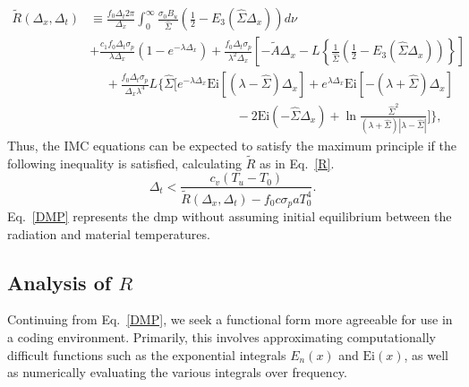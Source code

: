 \begin{align}\label{R}
\tilde R(\Delta_x,\Delta_t)&\equiv\frac{f_0\Delta_t2\pi}{\Delta_x}
  \int_0^\infty\frac{\sigma_0B_u}{\hat\Sigma}\left(\frac{1}{2}-
    E_3(\hat\Sigma\Delta_x)\right)d\nu \nonumber\\
  &+\frac{c_1f_0\Delta_t\sigma_p}{\lambda\Delta_x}(1-e^{-\lambda\Delta_x}) +
  \frac{f_0\Delta_t\sigma_p}{\lambda^2\Delta_x}\left[-\tilde A\Delta_x
    -L\left\{\frac{1}{\hat\Sigma}\left(\frac{1}{2}
    -E_3(\hat\Sigma\Delta_x)\right)\right\}\right] \\
  &\hspace{15pt}+\frac{f_0\Delta_t\sigma_p}{\Delta_x\lambda^4}L\Bigg\{\hat\Sigma
    \bigg[e^{-\lambda\Delta_x}\mbox{Ei}[(\lambda-\hat\Sigma)\Delta_x] +
    e^{\lambda\Delta_x}\mbox{Ei}[-(\lambda+\hat\Sigma)\Delta_x] \nonumber \\
  &\hspace{140pt} -2\mbox{Ei}(-\hat\Sigma\Delta_x)+ \nonumber
    \ln\frac{\hat\Sigma^2}{(\lambda+\hat\Sigma)|\lambda-\hat\Sigma|}
    \bigg]\Bigg\},
\end{align}
Thus, the IMC equations can be expected to satisfy the maximum principle if the
following inequality is satisfied, calculating $\tilde R$ as in Eq.\ \eqref{R}.
\begin{equation}\label{DMP}
\Delta_t<\frac{c_v(T_u-T_0)}{\tilde
R(\Delta_x,\Delta_t)-f_0c\sigma_paT_0^4}.
\end{equation}
Eq.\ \eqref{DMP} represents the \gls{dmp} without assuming initial equilibrium between the radiation and material temperatures.



%
%


\aboveSubSecSkip
\subsection{Analysis of $R$}
Continuing from Eq.\ \eqref{DMP}, we seek a functional form more agreeable for use in a coding environment. 
Primarily, this involves approximating computationally difficult functions such as the
exponential integrals $E_n(x)$ and $\mbox{Ei}(x)$, as well as numerically
evaluating
the various integrals over frequency.


